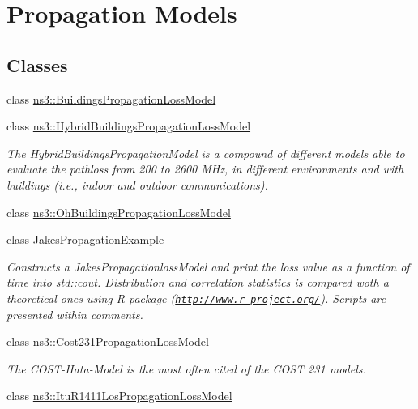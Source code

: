 \hypertarget{group__propagation}{}\section{Propagation Models}
\label{group__propagation}
\subsection*{Classes}
\begin{DoxyCompactItemize}
\item 
class \hyperlink{classns3_1_1BuildingsPropagationLossModel}{ns3\+::\+Buildings\+Propagation\+Loss\+Model}
\item 
class \hyperlink{classns3_1_1HybridBuildingsPropagationLossModel}{ns3\+::\+Hybrid\+Buildings\+Propagation\+Loss\+Model}
\begin{DoxyCompactList}\small\item\em The Hybrid\+Buildings\+Propagation\+Model is a compound of different models able to evaluate the pathloss from 200 to 2600 M\+Hz, in different environments and with buildings (i.\+e., indoor and outdoor communications). \end{DoxyCompactList}\item 
class \hyperlink{classns3_1_1OhBuildingsPropagationLossModel}{ns3\+::\+Oh\+Buildings\+Propagation\+Loss\+Model}
\item 
class \hyperlink{classJakesPropagationExample}{Jakes\+Propagation\+Example}
\begin{DoxyCompactList}\small\item\em Constructs a Jakes\+Propagationloss\+Model and print the loss value as a function of time into std\+::cout. Distribution and correlation statistics is compared woth a theoretical ones using R package (\href{http://www.r-project.org/}{\tt http\+://www.\+r-\/project.\+org/}). Scripts are presented within comments. \end{DoxyCompactList}\item 
class \hyperlink{classns3_1_1Cost231PropagationLossModel}{ns3\+::\+Cost231\+Propagation\+Loss\+Model}
\begin{DoxyCompactList}\small\item\em The C\+O\+S\+T-\/\+Hata-\/\+Model is the most often cited of the C\+O\+ST 231 models. \end{DoxyCompactList}\item 
class \hyperlink{classns3_1_1ItuR1411LosPropagationLossModel}{ns3\+::\+Itu\+R1411\+Los\+Propagation\+Loss\+Model}

\end{DoxyCompactItemize}
